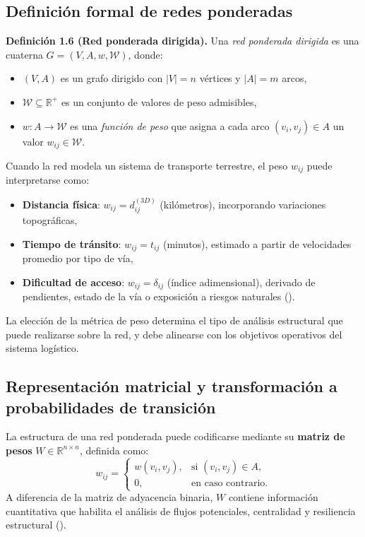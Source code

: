 \documentclass[
  spanish,
  us-letterpaper,
]{scrreprt}
\providecommand{\tightlist}{%
  \setlength{\itemsep}{0pt}\setlength{\parskip}{0pt}}
\numberwithin{equation}{section}
\begin{document}
\subsection{Definición formal de redes
ponderadas}\label{definiciuxf3n-formal-de-redes-ponderadas}

\textbf{Definición 1.6 (Red ponderada dirigida).} Una \emph{red
ponderada dirigida} es una cuaterna \(G = (V, A, w, \mathcal{W})\),
donde:

\begin{itemize}
\tightlist
\item
  \((V, A)\) es un grafo dirigido con \(|V| = n\) vértices y \(|A| = m\)
  arcos,
\item
  \(\mathcal{W} \subseteq \mathbb{R}^+\) es un conjunto de valores de
  peso admisibles,
\item
  \(w: A \to \mathcal{W}\) es una \emph{función de peso} que asigna a
  cada arco \((v_i, v_j) \in A\) un valor \(w_{ij} \in \mathcal{W}\).
\end{itemize}

Cuando la red modela un sistema de transporte terrestre, el peso
\(w_{ij}\) puede interpretarse como:

\begin{itemize}
\tightlist
\item
  \textbf{Distancia física}: \(w_{ij} = d_{ij}^{(3D)}\) (kilómetros),
  incorporando variaciones topográficas,
\item
  \textbf{Tiempo de tránsito}: \(w_{ij} = t_{ij}\) (minutos), estimado a
  partir de velocidades promedio por tipo de vía,
\item
  \textbf{Dificultad de acceso}: \(w_{ij} = \delta_{ij}\) (índice
  adimensional), derivado de pendientes, estado de la vía o exposición a
  riesgos naturales ().
\end{itemize}

La elección de la métrica de peso determina el tipo de análisis
estructural que puede realizarse sobre la red, y debe alinearse con los
objetivos operativos del sistema logístico.

\subsection{Representación matricial y transformación a probabilidades
de
transición}\label{representaciuxf3n-matricial-y-transformaciuxf3n-a-probabilidades-de-transiciuxf3n}

La estructura de una red ponderada puede codificarse mediante su
\textbf{matriz de pesos} \(W \in \mathbb{R}^{n \times n}\), definida
como: \[
w_{ij} = 
\begin{cases}
w(v_i, v_j), & \text{si } (v_i, v_j) \in A, \\
0, & \text{en caso contrario}.
\end{cases}
\] A diferencia de la matriz de adyacencia binaria, \(W\) contiene
información cuantitativa que habilita el análisis de flujos potenciales,
centralidad y resiliencia estructural
().
\end{document}
